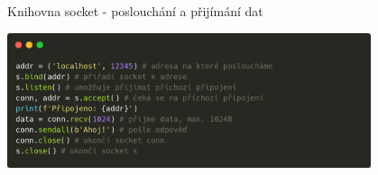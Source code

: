 \documentclass{beamer}
\begin{document}
\begin{frame}{Knihovna socket - poslouchání  a přijímání dat}
    \begin{center}
        \includegraphics[width=0.8\textwidth]{obrazky/codes/carbon12.png}
    \end{center}
\end{frame}
\end{document}
